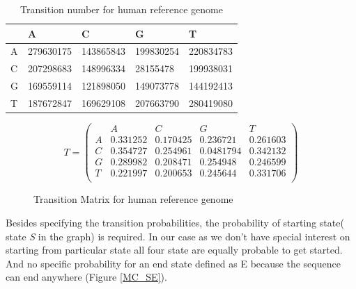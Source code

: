 \documentclass[11pt,a4paper]{report}
\begin{document}
\begin{table}[h]
  \begin{tabular}{ |  p{1cm} | p{2cm} | p{2cm} | p{2cm} | p{2cm} |}
    \hline
  	  
 	             & A   & C & G & T \\ \hline
      A  & 279630175  & 143865843 & 199830254 & 220834783 \\ \hline
 	  C	 & 207298683  & 148996334 & 28155478 & 199938031\\ \hline
 	  G	 & 169559114  & 121898050 & 149073778 & 144192413\\ \hline
 	  T  & 187672847  & 169629108  & 207663790 & 280419080\\ \hline
      
 	  
   \end{tabular}
  \caption{Transition number for human reference genome}
 \label{transition-table}
\end{table}



\begin{figure}[H]
 \centering
\[
T = 
 \begin{pmatrix}
   &  A  & C & G & T  \\
 A & 0.331252 & 0.170425 & 0.236721 & 0.261603  \\
 C & 0.354727 & 0.254961 & 0.0481794 & 0.342132  \\
 G & 0.289982 & 0.208471 & 0.254948 & 0.246599  \\
 T & 0.221997 & 0.200653 & 0.245644 & 0.331706 \\
  
 \end{pmatrix}
\]
 \caption{Transition Matrix for human reference genome}
 \label{transition-matrix}
\end{figure}

Besides specifying the transition probabilities, the probability of starting 
state( state \emph{S} in the graph) is required. In our case as we don't have
special interest on starting from particular state all four state are equally 
probable to get started. And no specific probability for an end state defined as 
E because the sequence can end anywhere (Figure \ref{MC_SE}).
\end{document}
